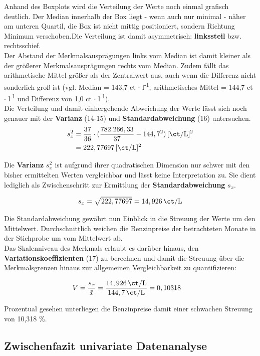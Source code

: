 Anhand des Boxplots wird die Verteilung der Werte noch einmal grafisch deutlich. Der Median innerhalb der Box liegt - wenn auch nur minimal - näher am unteren Quartil, die Box ist nicht mittig positioniert, sondern Richtung Minimum verschoben.Die Verteilung ist damit asymmetrisch: \textbf{linkssteil} bzw. rechtsschief.\\
Der Abstand der Merkmalsausprägungen links vom Median ist damit kleiner als der größerer Merkmalsausprägungen rechts vom Median. Zudem fällt das arithmetische Mittel größer als der Zentralwert aus, auch wenn die Differenz nicht sonderlich groß ist (vgl. Median = 143,7 ct $\cdot$ l\textsuperscript{-1}, arithmetisches Mittel = 144,7 ct $\cdot$ l\textsuperscript{-1} und Differenz von 1,0 ct $\cdot$ l\textsuperscript{-1}).\\

Die Verteilung und damit einhergehende Abweichung der Werte lässt sich noch genauer mit der \textbf{Varianz} (14-15) und \textbf{Standardabweichung} (16) untersuchen.\\

\begin{align}
 s_x^2 &= \frac{37}{36} \cdot (\frac{782.266,33}{37}-144,7^2) \, [\si{\ct\per\liter}]^2\\
      &= 222,77697 \, [\si{\ct\per\liter}]^2
\end{align}


Die \textbf{Varianz} $s_x^2$ ist aufgrund ihrer quadratischen Dimension nur schwer mit den bisher ermittelten Werten vergleichbar und lässt keine Interpretation zu. Sie dient lediglich als Zwischenschritt zur Ermittlung der \textbf{Standardabweichung} $s_x$.

\begin{align}
  s_x = \sqrt{222,77697} = 14,926 \, \si{\ct\per\liter}
\end{align}

Die Standardabweichung gewährt nun Einblick in die Streuung der Werte um den Mittelwert. Durchschnittlich weichen die Benzinpreise der betrachteten Monate in der Stichprobe um  vom Mittelwert ab.\\
Das Skalenniveau des Merkmals erlaubt es darüber hinaus, den \textbf{Variationskoeffizienten} (17) zu berechnen und damit die Streuung über die Merkmalsgrenzen hinaus zur allgemeinen Vergleichbarkeit zu quantifizieren:

\begin{align}
  V &= \frac{s_x}{\bar{x}} = \frac{14,926 \, \si{\ct\per\liter}}{144,7 \, \si{\ct\per\liter}} = 0,10318
\end{align}

Prozentual gesehen unterliegen die Benzinpreise damit einer schwachen Streuung von 10,318 \%.

\subsection{Zwischenfazit univariate Datenanalyse}
